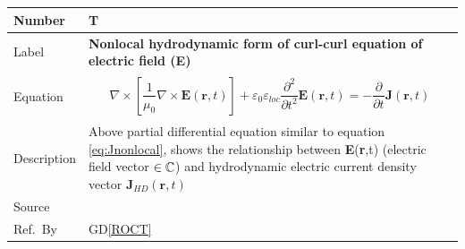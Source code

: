 \documentclass[12pt]{article}
\newcommand{\colAwidth}{0.13\textwidth}
\newcommand{\colBwidth}{0.82\textwidth}
\newcommand{\dref}[1]{GD\ref{#1}}
\newcounter{theorynum} %
\begin{document}
~\newline

~\newline

\noindent
\begin{minipage}{\textwidth}
	\renewcommand*{\arraystretch}{1.5}
	\begin{tabular}{| p{\colAwidth} | p{\colBwidth}|}
		\hline
		\rowcolor[gray]{0.9}
		Number& T{theorynum}\thetheorynum \label{TM:E}\\
		\hline
		Label&\bf Nonlocal hydrodynamic form of curl-curl equation of electric field (\textbf{E}) \\
		\hline
		Equation&  
		\begin{equation}
			\label{eq:Enonlocal}
			\begin{gathered}
							\nabla\times[\dfrac{1}{\mu_{0}}\nabla\times \textbf{E}(\textbf{r},t)] + \varepsilon_{0}\varepsilon_{loc}\dfrac{\partial^{2}}{\partial t^{2}}\textbf{E}(\textbf{r},t) = -\dfrac{\partial}{\partial t}\textbf{J}(\textbf{r},t)
			\end{gathered}  \end{equation} \\
		
		
		\hline
		Description & 
		Above partial differential equation similar to equation \ref{eq:Jnonlocal}, shows the relationship between \textbf{E}(\textbf{r},t) (electric field vector $\in \Bbb C$) and hydrodynamic electric current density vector $\textbf{J}_{HD}(\textbf{r},t)$
		\\
		\hline
		Source & 
		\cite{hiremath2012numerical} \\
		\hline
		Ref.\ By & \dref{ROCT}\\
		\hline
	\end{tabular}
\end{minipage}\\

~\newline

~\newline
\end{document}
